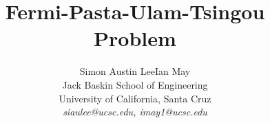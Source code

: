 \title{Fermi-Pasta-Ulam-Tsingou Problem}

\author{ 
Simon Austin Lee\hspace{.5cm}Ian May\hspace{.5cm}\\
Jack Baskin School of Engineering \\
University of California, Santa Cruz\\
\emph{siaulee@ucsc.edu, imay1@ucsc.edu}
}\date{}
\maketitle 
